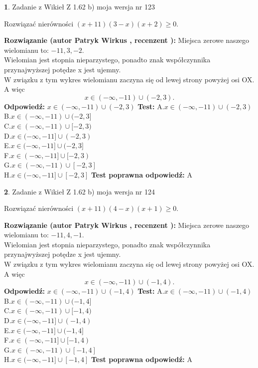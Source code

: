 \documentclass[12pt, a4paper]{article}
\theoremstyle{definition} %
\newtheorem{zad}{}
\newcommand{\zadStart}[1]{\begin{zad}#1\newline}
\newcommand{\zadStop}{\end{zad}}
\newcommand{\rozwStart}[2]{\noindent \textbf{Rozwiązanie (autor #1 , recenzent #2): }\newline}
\newcommand{\rozwStop}{\newline}
\newcommand{\odpStart}{\noindent \textbf{Odpowiedź:}\newline}
\newcommand{\odpStop}{\newline}
\newcommand{\testStart}{\noindent \textbf{Test:}\newline}
\newcommand{\testStop}{\newline}
\newcommand{\kluczStart}{\noindent \textbf{Test poprawna odpowiedź:}\newline}
\newcommand{\kluczStop}{\newline}
\begin{document}
\zadStart{Zadanie z Wikieł Z 1.62 b) moja wersja nr 123}

Rozwiązać nierówności $(x+11)(3-x)(x+2)\ge0$.
\zadStop
\rozwStart{Patryk Wirkus}{}
Miejsca zerowe naszego wielomianu to: $-11, 3, -2$.\\
Wielomian jest stopnia nieparzystego, ponadto znak współczynnika przy\linebreak najwyższej potędze x jest ujemny.\\ W związku z tym wykres wielomianu zaczyna się od lewej strony powyżej osi OX. A więc $$x \in (-\infty,-11) \cup (-2,3).$$
\rozwStop
\odpStart
$x \in (-\infty,-11) \cup (-2,3)$
\odpStop
\testStart
A.$x \in (-\infty,-11) \cup (-2,3)$\\
B.$x \in (-\infty,-11) \cup (-2,3]$\\
C.$x \in (-\infty,-11) \cup [-2,3)$\\
D.$x \in (-\infty,-11] \cup (-2,3)$\\
E.$x \in (-\infty,-11] \cup (-2,3]$\\
F.$x \in (-\infty,-11] \cup [-2,3)$\\
G.$x \in (-\infty,-11) \cup [-2,3]$\\
H.$x \in (-\infty,-11] \cup [-2,3]$
\testStop
\kluczStart
A
\kluczStop



\zadStart{Zadanie z Wikieł Z 1.62 b) moja wersja nr 124}

Rozwiązać nierówności $(x+11)(4-x)(x+1)\ge0$.
\zadStop
\rozwStart{Patryk Wirkus}{}
Miejsca zerowe naszego wielomianu to: $-11, 4, -1$.\\
Wielomian jest stopnia nieparzystego, ponadto znak współczynnika przy\linebreak najwyższej potędze x jest ujemny.\\ W związku z tym wykres wielomianu zaczyna się od lewej strony powyżej osi OX. A więc $$x \in (-\infty,-11) \cup (-1,4).$$
\rozwStop
\odpStart
$x \in (-\infty,-11) \cup (-1,4)$
\odpStop
\testStart
A.$x \in (-\infty,-11) \cup (-1,4)$\\
B.$x \in (-\infty,-11) \cup (-1,4]$\\
C.$x \in (-\infty,-11) \cup [-1,4)$\\
D.$x \in (-\infty,-11] \cup (-1,4)$\\
E.$x \in (-\infty,-11] \cup (-1,4]$\\
F.$x \in (-\infty,-11] \cup [-1,4)$\\
G.$x \in (-\infty,-11) \cup [-1,4]$\\
H.$x \in (-\infty,-11] \cup [-1,4]$
\testStop
\kluczStart
A
\kluczStop
\end{document}
